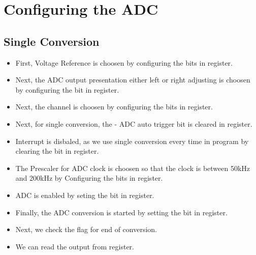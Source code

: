 \section{Configuring the ADC}
\subsection{Single Conversion}
\begin{itemize}
    \item First, Voltage Reference is choosen by configuring the  bits in  register.
    \item Next, the ADC output presentation either left or right adjusting is choosen by configuring the  bit in  register.
    \item Next, the channel is choosen by configuring the  bits in  register.
    \item Next, for single conversion, the  - ADC auto trigger bit is cleared in  register.
    \item Interrupt is disbaled, as we use single conversion every time in program by clearing the  bit in  register.
    \item The Prescaler for ADC clock is choosen so that the clock is  between 50kHz and 200kHz  by Configuring the  bits in  register.
    \item ADC is enabled by seting the  bit in  register.
    \item Finally, the ADC conversion is started by setting the  bit in   register.
    \item Next, we check the  flag for end of conversion.
    \item We can read the output from  register.
\end{itemize}
